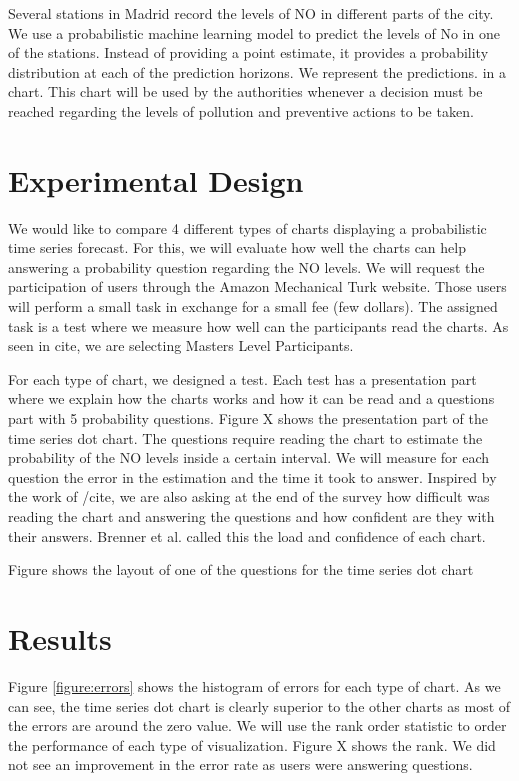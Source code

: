 \documentclass[a4paper,3p,sort&compress]{elsarticle}
\begin{document}
Several stations in Madrid record the levels of NO in different parts of the city. We use a probabilistic
machine learning model to predict the levels of No in one of the stations. Instead of providing a point estimate, it provides a probability distribution at each of the prediction horizons. We represent the predictions. in a chart. This chart will be used by the authorities whenever a decision must be reached regarding the levels of pollution and preventive actions to be taken.

\section{Experimental Design}
\label{sec:exp_design}

We would like to compare 4 different types of charts displaying a probabilistic time series forecast. For this, we will evaluate how well the charts can help answering a probability question regarding the NO levels. We will request the participation of users through the Amazon Mechanical Turk website. Those users will perform a small task in exchange for a small fee (few dollars). The assigned task is a test where we measure how well can the participants read the charts. As seen in cite, we are selecting Masters Level Participants.

For each type of chart, we designed a test. Each test has a presentation part where we explain how the charts works and how it can be read and a questions part with 5 probability questions. Figure X shows the presentation part of the time series dot chart. The questions require reading the chart to estimate the probability of the NO levels inside a certain interval. We will measure for each question the error in the estimation and the time it took to answer. Inspired by the work of /cite, we are also asking at the end of the survey how difficult was reading the chart and answering the questions and how confident are they with their answers. Brenner et al. called this the load and confidence of each chart.

Figure shows the layout of one of the questions for the time series dot chart

\section{Results}
\label{sec:results}

Figure \ref{figure:errors} shows the histogram of errors for each type of chart. As we can see, the time series dot chart is clearly superior to the other charts as most of the errors are around the zero value. We will use the rank order statistic to order the performance of each type of visualization. Figure X shows the rank. We did not see an improvement in the error rate as users were answering questions.
\end{document}
